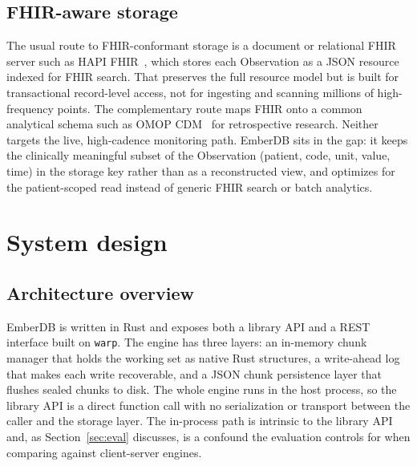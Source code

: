 \documentclass[journal]{IEEEtran}
\begin{document}
\subsection{FHIR-aware storage}
The usual route to FHIR-conformant storage is a document or relational FHIR server such as HAPI FHIR~\cite{hapifhir}, which stores each Observation as a JSON resource indexed for FHIR search. That preserves the full resource model but is built for transactional record-level access, not for ingesting and scanning millions of high-frequency points. The complementary route maps FHIR onto a common analytical schema such as OMOP CDM~\cite{omop} for retrospective research. Neither targets the live, high-cadence monitoring path. EmberDB sits in the gap: it keeps the clinically meaningful subset of the Observation (patient, code, unit, value, time) in the storage key rather than as a reconstructed view, and optimizes for the patient-scoped read instead of generic FHIR search or batch analytics.

\section{System design}
\label{sec:design}

\subsection{Architecture overview}
EmberDB is written in Rust and exposes both a library API and a REST interface built on \texttt{warp}. The engine has three layers: an in-memory chunk manager that holds the working set as native Rust structures, a write-ahead log that makes each write recoverable, and a JSON chunk persistence layer that flushes sealed chunks to disk. The whole engine runs in the host process, so the library API is a direct function call with no serialization or transport between the caller and the storage layer. The in-process path is intrinsic to the library API and, as Section~\ref{sec:eval} discusses, is a confound the evaluation controls for when comparing against client-server engines.
\end{document}
